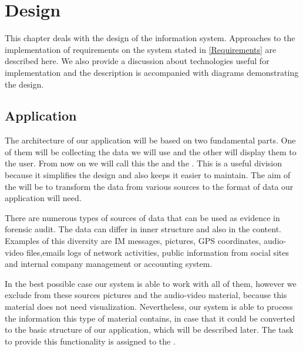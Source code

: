 \chapter{Design} \label {Design}


This chapter deals with the design of the information system. Approaches to the implementation of requirements on the system stated in \ref{Requirements} are described here. We also provide a discussion about technologies useful for implementation and the description is accompanied with diagrams demonstrating the design. 

\section{Application}

The architecture of our application will be based on two fundamental parts. One of them will be collecting the data we will use and the other will display them to the user. From now on we will call this the  and the . This is a useful division because it simplifies the design and also keeps it easier to maintain. The aim of the  will be to transform the data from various sources to the format of data our application will need. 

There are numerous types of sources of data that can be used as evidence in forensic audit. The data can differ in inner structure and also in the content. Examples of this diversity are IM messages, pictures, GPS coordinates, audio-video files,emails logs of network activities, public information from social sites and internal company management or accounting system.

In the best possible case our system is able to work with all of them, however we exclude from these sources pictures and the audio-video material, because this material does not need visualization. Nevertheless, our system is able to process the information this type of material contains, in case that it could be converted to the basic structure of our application, which will be described later. The task to provide this functionality is assigned to the .

